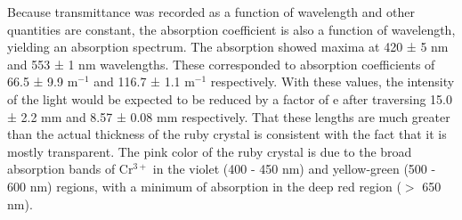 \documentclass[11pt, a4paper, twocolumn]{article}
\begin{document}
Because transmittance was recorded as a function of wavelength and other quantities are constant, the absorption coefficient is also a function of wavelength, yielding an absorption spectrum. The absorption showed maxima at 420 ± 5 nm and 553 ± 1 nm wavelengths. These corresponded to absorption coefficients of 66.5 ± 9.9 m$^{-1}$ and 116.7 ± 1.1 m$^{-1}$ respectively. With these values, the intensity of the light would be expected to be reduced by a factor of e after traversing 15.0 ± 2.2 mm and 8.57 ± 0.08 mm respectively. That these lengths are much greater than the actual thickness of the ruby crystal is consistent with the fact that it is mostly transparent. The pink color of the ruby crystal is due to the broad absorption bands of Cr$^{3+}$ in the violet (400 - 450 nm) and yellow-green (500 - 600 nm) regions, with a minimum of absorption in the deep red region ($>$ 650 nm).
\end{document}
